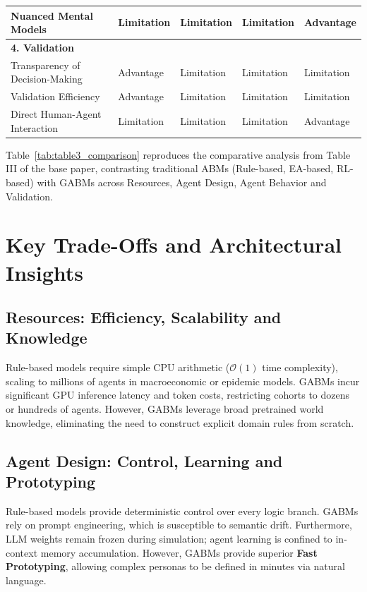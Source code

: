 \documentclass[12pt,a4paper]{report}
\begin{document}
\begin{table}[H]
\begin{tabular}{|p{5.4cm}|p{2.2cm}|p{2.2cm}|p{2.2cm}|p{2.2cm}|}
\hline
\quad Nuanced Mental Models & Limitation & Limitation & Limitation & Advantage \\
\hline
\multicolumn{5}{|l|}{\textbf{4. Validation}} \\
\hline
\quad Transparency of Decision-Making & Advantage & Limitation & Limitation & Limitation \\
\hline
\quad Validation Efficiency & Advantage & Limitation & Limitation & Limitation \\
\hline
\quad Direct Human-Agent Interaction & Limitation & Limitation & Limitation & Advantage \\
\hline
\end{tabular}
\end{table}

Table~\ref{tab:table3_comparison} reproduces the comparative analysis from Table III of the base paper, contrasting traditional ABMs (Rule-based, EA-based, RL-based) with GABMs across Resources, Agent Design, Agent Behavior and Validation.

\section{Key Trade-Offs and Architectural Insights}
\label{sec:trade_offs}

\subsection{Resources: Efficiency, Scalability and Knowledge}
Rule-based models require simple CPU arithmetic ($\mathcal{O}(1)$ time complexity), scaling to millions of agents in macroeconomic or epidemic models. GABMs incur significant GPU inference latency and token costs, restricting cohorts to dozens or hundreds of agents. However, GABMs leverage broad pretrained world knowledge, eliminating the need to construct explicit domain rules from scratch.

\subsection{Agent Design: Control, Learning and Prototyping}
Rule-based models provide deterministic control over every logic branch. GABMs rely on prompt engineering, which is susceptible to semantic drift. Furthermore, LLM weights remain frozen during simulation; agent learning is confined to in-context memory accumulation. However, GABMs provide superior \textbf{Fast Prototyping}, allowing complex personas to be defined in minutes via natural language.
\end{document}

